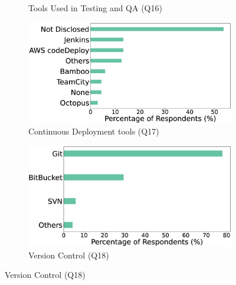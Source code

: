 \begin{figure}[t]
\begin{subfigure}{0.45\textwidth}
        \caption{Tools Used in Testing and QA (Q16)}
        \label{fig:testingTools}
    \end{subfigure}
    \begin{subfigure}{0.45\textwidth}
        \includegraphics[scale=0.1]{Figures/Respondents_deployment_tools}
        \caption{Continuous Deployment tools (Q17)}
        \label{fig:deployTools}
    \end{subfigure}
    \begin{subfigure}{0.4\textwidth}
        \includegraphics[scale=0.12]{Figures/Respondents_version_control}
        \caption{Version Control (Q18)}
        \label{fig:versionControl}
    \end{subfigure}
\end{figure}

